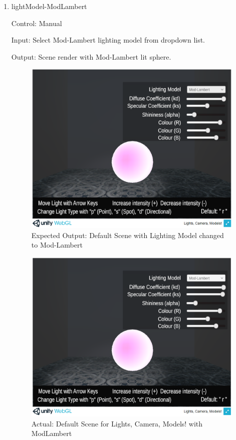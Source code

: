 \documentclass[12pt, titlepage]{article}
\begin{document}
\begin{enumerate}
	
	\item{lightModel-ModLambert\\}
	
	Control: Manual
	
	Input: Select Mod-Lambert lighting model from dropdown list.
	
	Output: Scene render with Mod-Lambert lit sphere.
	
	\begin{figure}[h]
		\centering
		\includegraphics[scale=0.25]{./images/fromVnVPlan/sphere-lit-modlambert}
		\caption{Expected Output: Default Scene with Lighting Model changed to 
		Mod-Lambert}
		\label{fig:modLambert}
	\end{figure}
	
	\begin{figure}
		\centering
		\includegraphics[scale=0.25]{./images/defaultScene-mLam}
		\caption{Actual: Default Scene for Lights, Camera, Models! with 
		ModLambert}
	\end{figure}
	

\end{enumerate}
\end{document}
